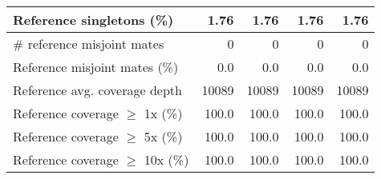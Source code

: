 \documentclass[12pt,a4paper]{article}
\begin{document}
\begin{table}[ht]
\begin{center}
\begin{tabular}{|l*{4}{|r}|}
Reference singletons (\%) & 1.76 & 1.76 & 1.76 & 1.76 \\ \hline
\# reference misjoint mates & 0 & 0 & 0 & 0 \\ \hline
Reference misjoint mates (\%) & 0.0 & 0.0 & 0.0 & 0.0 \\ \hline
Reference avg. coverage depth & 10089 & 10089 & 10089 & 10089 \\ \hline
Reference coverage $\geq$ 1x (\%) & 100.0 & 100.0 & 100.0 & 100.0 \\ \hline
Reference coverage $\geq$ 5x (\%) & 100.0 & 100.0 & 100.0 & 100.0 \\ \hline
Reference coverage $\geq$ 10x (\%) & 100.0 & 100.0 & 100.0 & 100.0 \\ \hline
\end{tabular}
\end{center}
\end{table}
\end{document}
